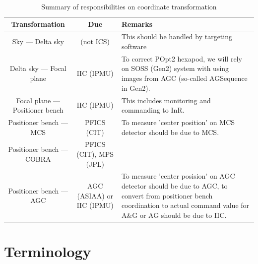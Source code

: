 \documentclass[a4paper,notitlepage]{article}
\begin{document}
\begin{table}[htb]
\caption{Summary of responsibilities on coordinate transformation}
\label{resp-coordtrans}
\begin{center}
\begin{tabular}{c|c|p{15em}}
  Transformation & Due & Remarks \\
  \hline
  Sky --- Delta sky & (not ICS)
    & This should be handled by targeting software \\
  \hline
  Delta sky --- Focal plane & IIC (IPMU)
    & To correct POpt2 hexapod, we will rely on SOSS (Gen2) system with using 
    images from AGC (so-called AGSequence in Gen2). \\
  \hline
  Focal plane --- Positioner bench & IIC (IPMU)
    & This includes monitoring and commanding to InR. \\
  \hline
  Positioner bench --- MCS & PFICS (CIT)
    & To measure 'center position' on MCS detector should be due to MCS. \\
  \hline
  Positioner bench --- COBRA & PFICS (CIT), MPS (JPL)
    & \\
  \hline
  Positioner bench --- AGC & AGC (ASIAA) or IIC (IPMU)
    & To measure 'center posision' on AGC detector should be due to AGC, 
    to convert from positioner bench coordination to actual command value 
    for A\&G or AG should be due to IIC. \\
\end{tabular}
\end{center}
\end{table}


\section{Terminology}
\end{document}

